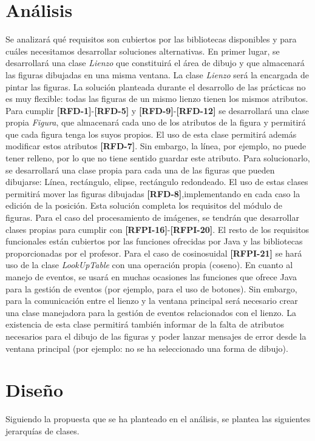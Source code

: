 \section{Análisis}

Se analizará qué requisitos son cubiertos por las bibliotecas disponibles y para cuáles necesitamos desarrollar soluciones alternativas.
\vskip0.3cm
En primer lugar, se desarrollará una clase \textit{Lienzo} que constituirá el área de dibujo y que almacenará las figuras dibujadas en una misma ventana. La clase \textit{Lienzo} será la encargada de pintar las figuras.
\vskip0.3cm
La solución planteada durante el desarrollo de las prácticas no es muy flexible: todas las figuras de un mismo lienzo tienen los mismos atributos. Para cumplir \textbf{[RFD-1]}-\textbf{[RFD-5]} y \textbf{[RFD-9]}-\textbf{[RFD-12]} se desarrollará una clase propia \textit{Figura}, que almacenará cada uno de los atributos de la figura y permitirá que cada figura tenga los suyos propios. El uso de esta clase permitirá además modificar estos atributos \textbf{[RFD-7]}. Sin embargo, la línea, por ejemplo, no puede tener relleno, por lo que no tiene sentido guardar este atributo.
\vskip0.3cm
Para solucionarlo, se desarrollará una clase propia para cada una de las figuras que pueden dibujarse: Línea, rectángulo, elipse, rectángulo redondeado. El uso de estas clases permitirá mover las figuras dibujadas \textbf{[RFD-8]},implementando en cada caso la edición de la posición.
\vskip0.3cm
Esta solución completa los requisitos del módulo de figuras. Para el caso del procesamiento de imágenes, se tendrán que desarrollar clases propias para cumplir con \textbf{[RFPI-16]}-\textbf{[RFPI-20]}. El resto de los requisitos funcionales están cubiertos por las funciones ofrecidas por Java y las bibliotecas proporcionadas por el profesor. Para el caso de cosinosuidal \textbf{[RFPI-21]} se hará uso de la clase \textit{LookUpTable} con una operación propia (coseno).
\vskip0.3cm
En cuanto al manejo de eventos, se usará en muchas ocasiones las funciones que ofrece Java para la gestión de eventos (por ejemplo, para el uso de botones). Sin embargo, para la comunicación entre el lienzo y la ventana principal será necesario crear una clase manejadora para la gestión de eventos relacionados con el lienzo. La existencia de esta clase permitirá también informar de la falta de atributos necesarios para el dibujo de las figuras y poder lanzar mensajes de error desde la ventana principal (por ejemplo: no se ha seleccionado una forma de dibujo). 
\section{Diseño}
Siguiendo la propuesta que se ha planteado en el análisis, se plantea las siguientes jerarquías de clases.
